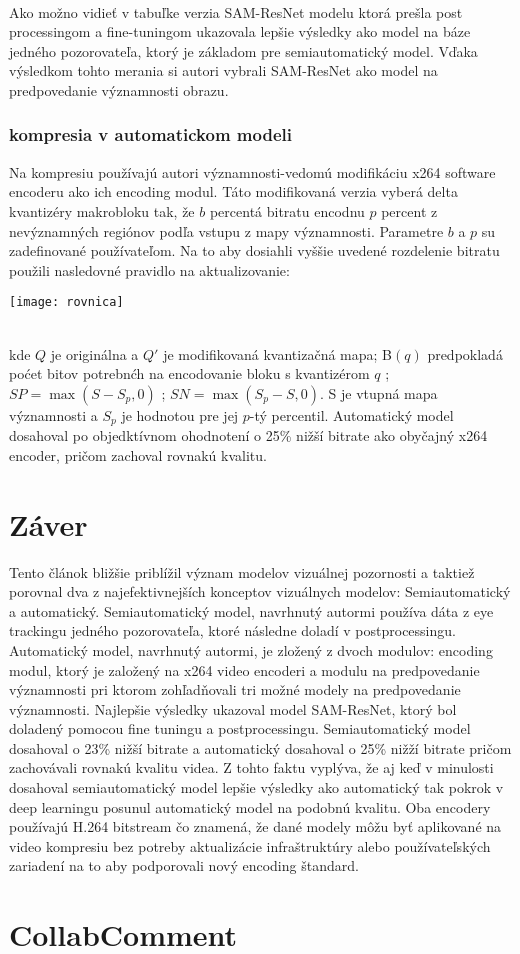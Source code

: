 \documentclass[10pt,twoside,slovak,a4paper]{article}
\begin{document}
\\
Ako možno vidieť v tabuľke verzia SAM-ResNet modelu ktorá prešla post processingom a fine-tuningom ukazovala lepšie výsledky ako model na báze jedného pozorovateľa, ktorý je základom pre semiautomatický model. Vďaka výsledkom tohto merania si autori\cite{Czarnecki:Progress} vybrali SAM-ResNet ako model na predpovedanie významnosti obrazu.
\subsubsection{kompresia v automatickom modeli}
Na kompresiu používajú autori\cite{Czarnecki:Progress} významnosti-vedomú modifikáciu x264 software encoderu ako ich encoding modul. Táto modifikovaná verzia vyberá delta kvantizéry makrobloku tak, že \(b\) percentá bitratu encodnu \(p\) percent z nevýznamných regiónov podľa vstupu z mapy významnosti. Parametre \(b\) a \(p\) su zadefinované používateľom. Na to aby dosiahli vyššie uvedené rozdelenie bitratu použili nasledovné pravidlo na aktualizovanie:
\begin{figure*}[tbh]
\centering
\texttt{[image: rovnica]}
\label{f:rovnica}
\end{figure*}
\\
kde \(Q\) je originálna a \({Q}'\) je modifikovaná kvantizačná mapa; B\((q)\) predpokladá poćet bitov potrebnćh na encodovanie bloku s kvantizérom \(q\) ; \(SP = \max(S - S_{p}, 0)\) ; \(SN = \max(S_{p} - S, 0)\). S je vtupná mapa významnosti a \(S_{p}\) je hodnotou pre jej \(p\)-tý percentil. Automatický model dosahoval po objedktívnom ohodnotení o 25\% nižší bitrate ako obyčajný x264 encoder, pričom zachoval rovnakú kvalitu. 

\section{Záver} \label{zaver} 
Tento článok bližšie priblížil význam modelov vizuálnej pozornosti a taktiež porovnal dva z najefektivnejších konceptov vizuálnych modelov: Semiautomatický a automatický. Semiautomatický model, navrhnutý autormi\cite{Coplien:MPD} používa dáta z eye trackingu jedného pozorovateľa, ktoré následne doladí v postprocessingu. Automatický model, navrhnutý autormi\cite{Czarnecki:Progress}, je zložený z dvoch modulov: encoding modul, ktorý je založený na x264 video encoderi a modulu na predpovedanie významnosti pri ktorom zohľadňovali tri možné modely na predpovedanie významnosti. Najlepšie výsledky ukazoval model SAM-ResNet, ktorý bol doladený pomocou fine tuningu a postprocessingu. Semiautomatický model dosahoval o 23\% nižší bitrate a automatický dosahoval o 25\% nižží bitrate pričom zachovávali rovnakú kvalitu videa. Z tohto faktu vyplýva, že aj keď v minulosti dosahoval semiautomatický model lepšie výsledky ako automatický tak pokrok v deep learningu posunul automatický model na podobnú kvalitu. Oba encodery používajú H.264 bitstream čo znamená, že dané modely môžu byť aplikované na video kompresiu bez potreby aktualizácie infraštruktúry alebo používateľských zariadení na to aby podporovali nový encoding štandard.
\section{CollabComment} \label{comment}

\end{document}

